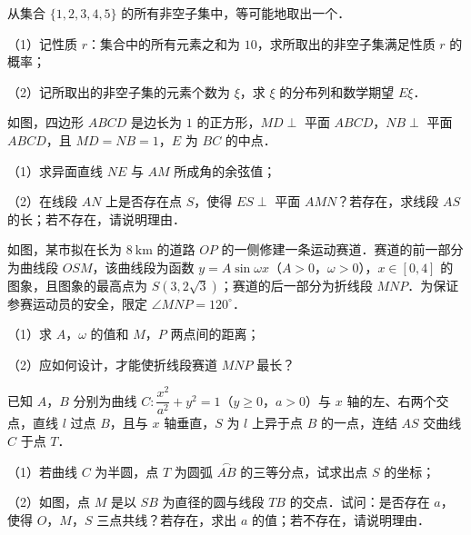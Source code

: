 \begingroup
\renewenvironment{question}{\Needspace{0.5\textheight}}{}
\begin{question}
从集合 $\{1,2,3,4,5\}$ 的所有非空子集中，等可能地取出一个．

（1）记性质 $r$：集合中的所有元素之和为 $10$，求所取出的非空子集满足性质 $r$ 的概率；

（2）记所取出的非空子集的元素个数为 $\xi$，求 $\xi$ 的分布列和数学期望 $E\xi$．

\Needspace{0.4\textheight}
\end{question}
\endgroup
\begin{question}
如图，四边形 $ABCD$ 是边长为 $1$ 的正方形，$MD\perp$ 平面 $ABCD$，$NB\perp$ 平面 $ABCD$，且 $MD=NB=1$，$E$ 为 $BC$ 的中点．

（1）求异面直线 $NE$ 与 $AM$ 所成角的余弦值；

（2）在线段 $AN$ 上是否存在点 $S$，使得 $ES\perp$ 平面 $AMN$？若存在，求线段 $AS$ 的长；若不存在，请说明理由．
\nopagebreak[4]
\begin{center}\end{center}
\nopagebreak[4]
\Needspace{0.4\textheight}
\end{question}
\begingroup
\renewenvironment{question}{\Needspace{0.5\textheight}}{}
\begin{question}
如图，某市拟在长为 $8\ \mathrm{km}$ 的道路 $OP$ 的一侧修建一条运动赛道．赛道的前一部分为曲线段 $OSM$，该曲线段为函数 $y=A\sin\omega x$（$A>0$，$\omega>0$），$x\in[0,4]$ 的图象，且图象的最高点为 $S(3,2\sqrt3)$；赛道的后一部分为折线段 $MNP$．为保证参赛运动员的安全，限定 $\angle MNP=120^\circ$．

（1）求 $A$，$\omega$ 的值和 $M$，$P$ 两点间的距离；

（2）应如何设计，才能使折线段赛道 $MNP$ 最长？
\nopagebreak[4]
\begin{center}\end{center}
\nopagebreak[4]
\Needspace{0.4\textheight}
\end{question}
\endgroup
\begingroup
\renewenvironment{question}{\Needspace{0.5\textheight}}{}
\begin{question}
已知 $A$，$B$ 分别为曲线 $C:\dfrac{x^2}{a^2}+y^2=1$（$y\geqslant0$，$a>0$）与 $x$ 轴的左、右两个交点，直线 $l$ 过点 $B$，且与 $x$ 轴垂直，$S$ 为 $l$ 上异于点 $B$ 的一点，连结 $AS$ 交曲线 $C$ 于点 $T$．

（1）若曲线 $C$ 为半圆，点 $T$ 为圆弧 $\overset{\frown}{AB}$ 的三等分点，试求出点 $S$ 的坐标；

（2）如图，点 $M$ 是以 $SB$ 为直径的圆与线段 $TB$ 的交点．试问：是否存在 $a$，使得 $O$，$M$，$S$ 三点共线？若存在，求出 $a$ 的值；若不存在，请说明理由．
\nopagebreak[4]
\begin{center}\end{center}
\nopagebreak[4]
\end{question}
